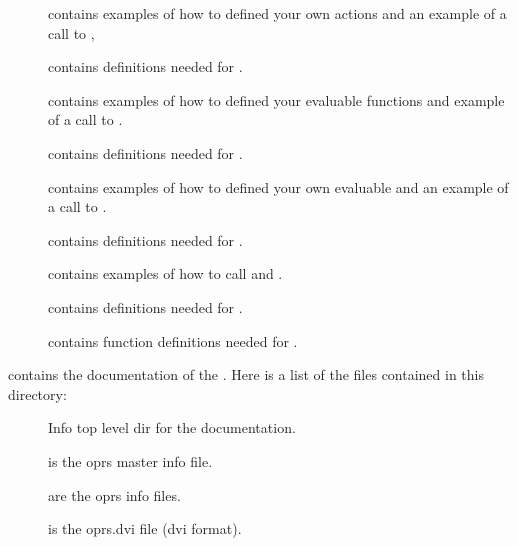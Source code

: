 \begin{description}
\begin{description}
\item [] contains examples of how to defined your own
actions and an example of a call to ,

\item [] contains definitions needed for .

\item [] contains examples of how to defined your
evaluable functions and example of a call to .

\item [] contains definitions needed for .

\item [] contains examples of how to defined your own
evaluable  and an example of a call to .

\item [] contains definitions needed for .

\item [] contains examples of how to call
 and .

\item [] contains definitions needed for .

\item [] contains function definitions needed for
.

\end{description}

\item [\file{doc}] contains the documentation of the \COPRSDE{}. Here is a
list of the files contained in this directory:

\begin{description}

\item [] Info top level dir for the documentation.

\item [] is the oprs master info file.

\item [] are the oprs info files.

\item [] is the oprs.dvi file (dvi format).


\end{description}
\end{description}
